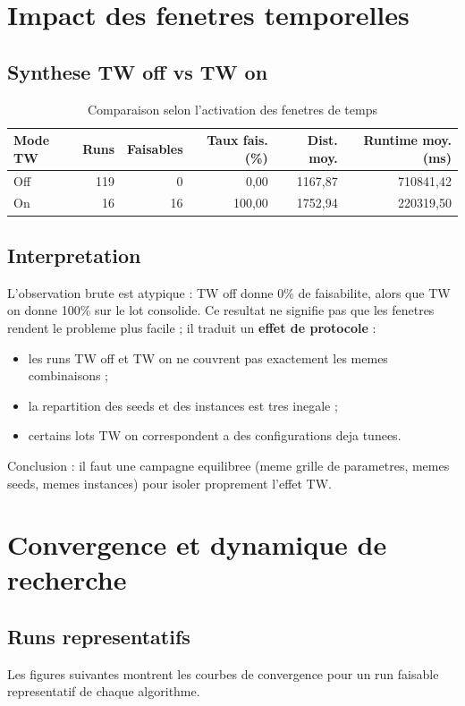 \documentclass[12pt,a4paper]{report}
\begin{document}
\chapter{Impact des fenetres temporelles}

\section{Synthese TW off vs TW on}
\begin{table}[H]
\centering
\caption{Comparaison selon l'activation des fenetres de temps}
\label{tab:tw_compare}
\begin{tabular}{lrrrrr}
\toprule
Mode TW & Runs & Faisables & Taux fais. (\%) & Dist. moy. & Runtime moy. (ms) \\
\midrule
Off & 119 & 0 & 0,00 & 1167,87 & 710841,42 \\
On & 16 & 16 & 100,00 & 1752,94 & 220319,50 \\
\bottomrule
\end{tabular}
\end{table}

\section{Interpretation}
L'observation brute est atypique : TW off donne 0\% de faisabilite,
alors que TW on donne 100\% sur le lot consolide.
Ce resultat ne signifie pas que les fenetres rendent le probleme plus facile ;
il traduit un \textbf{effet de protocole} :
\begin{itemize}[leftmargin=1.2cm]
  \item les runs TW off et TW on ne couvrent pas exactement les memes combinaisons ;
  \item la repartition des seeds et des instances est tres inegale ;
  \item certains lots TW on correspondent a des configurations deja tunees.
\end{itemize}

Conclusion : il faut une campagne equilibree (meme grille de parametres, memes seeds, memes instances)
pour isoler proprement l'effet TW.

\chapter{Convergence et dynamique de recherche}

\section{Runs representatifs}
Les figures suivantes montrent les courbes de convergence
pour un run faisable representatif de chaque algorithme.
\end{document}
